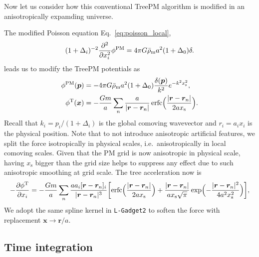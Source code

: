 \documentclass[a4paper,11pt]{article}
\DeclareMathOperator{\erfc}{erfc}
\newcommand{\vr}{{\bm r}}
\newcommand{\vx}{{\bm x}}
\newcommand{\vp}{{\bm p}}
\newcommand{\rhobarm}{{\bar\rho_\mathrm{m}}}
\newcommand{\Tree}{\mathrm{T}}
\newcommand{\PM}{\mathrm{PM}}
\newcommand{\xs}{x_\mathrm{s}}
\begin{document}
Now let us consider how this conventional TreePM algorithm is modified
in an anisotropically expamding universe.

The modified Poisson equation Eq.~\eqref{eq:poisson_local},
\begin{equation}
    (1+\Delta_i)^{-2} \frac{\partial^2}{\partial x_i^2} \phi^{\rm PM}
    = 4\pi G \rhobarm a^2 (1 + \Delta_0) \delta.
\end{equation}
leads us to modify the TreePM potentials as
\begin{align}
    \phi^\PM(\vp) &= - 4\pi G \rhobarm a^2 (1 + \Delta_0)
        \frac{\delta(\vp)}{k^2} e^{- k^2 \xs^2}, \\
    \phi^\Tree(\vx) &= - \frac{G m}a \sum_n \frac{a}{|\vr - \vr_n|}
    \erfc \Bigl( \frac{|\vr - \vr_n|}{2 a \xs} \Bigr).
\end{align}
Recall that $k_i = p_i / (1 + \Delta_i)$ is the global comoving wavevector
and $r_i = a_i x_i$ is the physical position.
Note that to not introduce anisotropic artificial features, we split the force
isotropically in physical scales, i.e.\ anisotropically in local comoving
scales.
Given that the PM grid is now anisotropic in physical scale, having $\xs$
bigger than the grid size helps to suppress any effect due to such anisotropic
smoothing at grid scale.
The tree acceleration now is
\begin{equation}
    - \frac{\partial\phi^\Tree}{\partial x_i} = - \frac{G m}a \sum_n
    \frac{a a_i [\vr - \vr_n]_i}{|\vr - \vr_n|^3}
    \biggl[ \erfc \Bigl( \frac{|\vr - \vr_n|}{2 a \xs} \Bigr)
            + \frac{|\vr - \vr_n|}{a \xs \sqrt\pi}
            \exp \Bigl( - \frac{|\vr - \vr_n|^2}{4 a^2 \xs^2} \Bigr) \biggr],
\end{equation}
We adopt the same spline kernel in \texttt{L-Gadget2} to soften the force
with replacement $\vx \to \vr / a$.







\subsection{Time integration}
\label{sub:integ}
\end{document}
